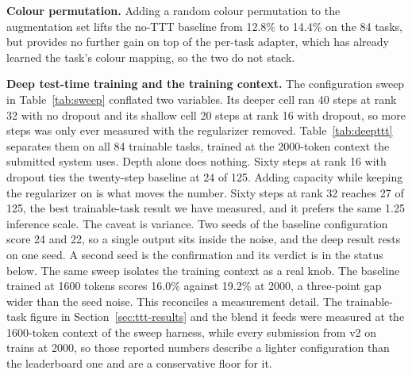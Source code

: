 \documentclass[11pt]{article}
\begin{document}
\textbf{Colour permutation.} Adding a random colour permutation to the augmentation set lifts the
no-TTT baseline from 12.8\% to 14.4\% on the 84 tasks, but provides no further gain on top of the
per-task adapter, which has already learned the task's colour mapping, so the two do not stack.

\textbf{Deep test-time training and the training context.} The configuration sweep in
Table~\ref{tab:sweep} conflated two variables. Its deeper cell ran 40 steps at rank 32 with no dropout
and its shallow cell 20 steps at rank 16 with dropout, so more steps was only ever measured with the
regularizer removed. Table~\ref{tab:deepttt} separates them on all 84 trainable tasks, trained at the
2000-token context the submitted system uses. Depth alone does nothing. Sixty steps at rank 16 with
dropout ties the twenty-step baseline at 24 of 125. Adding capacity while keeping the regularizer on is
what moves the number. Sixty steps at rank 32 reaches 27 of 125, the best trainable-task result we have
measured, and it prefers the same 1.25 inference scale. The caveat is variance. Two seeds of the
baseline configuration score 24 and 22, so a single output sits inside the noise, and the deep result
rests on one seed. A second seed is the confirmation and its verdict is in the status below. The same
sweep isolates the training context as a real knob. The baseline trained at 1600 tokens scores 16.0\%
against 19.2\% at 2000, a three-point gap wider than the seed noise. This reconciles a measurement
detail. The trainable-task figure in Section~\ref{sec:ttt-results} and the blend it feeds were measured
at the 1600-token context of the sweep harness, while every submission from v2 on trains at 2000, so
those reported numbers describe a lighter configuration than the leaderboard one and are a conservative
floor for it.
\end{document}
